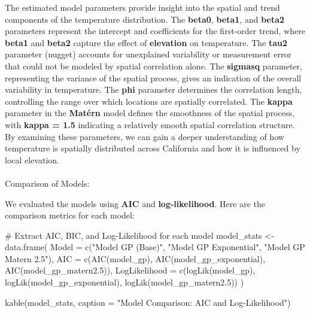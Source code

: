 \documentclass[
  11pt,
]{article}
\makeatletter
\let\oldparagraph\paragraph
\renewcommand{\paragraph}{
    \@ifstar
      \xxxParagraphStar
      \xxxParagraphNoStar
  }
\newcommand{\xxxParagraphStar}[1]{\oldparagraph*{#1}\mbox{}}
\newcommand{\xxxParagraphNoStar}[1]{\oldparagraph{#1}\mbox{}}
\newenvironment{Shaded}{\begin{snugshade}}{\end{snugshade}}
\newcommand{\AttributeTok}[1]{\textcolor[rgb]{0.40,0.45,0.13}{#1}}
\newcommand{\CommentTok}[1]{\textcolor[rgb]{0.37,0.37,0.37}{#1}}
\newcommand{\FloatTok}[1]{\textcolor[rgb]{0.68,0.00,0.00}{#1}}
\newcommand{\FunctionTok}[1]{\textcolor[rgb]{0.28,0.35,0.67}{#1}}
\newcommand{\NormalTok}[1]{\textcolor[rgb]{0.00,0.23,0.31}{#1}}
\newcommand{\OtherTok}[1]{\textcolor[rgb]{0.00,0.23,0.31}{#1}}
\newcommand{\StringTok}[1]{\textcolor[rgb]{0.13,0.47,0.30}{#1}}
\makeatother
\begin{document}
The estimated model parameters provide insight into the spatial and
trend components of the temperature distribution. The \textbf{beta0},
\textbf{beta1}, and \textbf{beta2} parameters represent the intercept
and coefficients for the first-order trend, where \textbf{beta1} and
\textbf{beta2} capture the effect of \textbf{elevation} on temperature.
The \textbf{tau2} parameter (nugget) accounts for unexplained
variability or measurement error that could not be modeled by spatial
correlation alone. The \textbf{sigmasq} parameter, representing the
variance of the spatial process, gives an indication of the overall
variability in temperature. The \textbf{phi} parameter determines the
correlation length, controlling the range over which locations are
spatially correlated. The \textbf{kappa} parameter in the
\textbf{Matérn} model defines the smoothness of the spatial process,
with \textbf{kappa = 1.5} indicating a relatively smooth spatial
correlation structure. By examining these parameters, we can gain a
deeper understanding of how temperature is spatially distributed across
California and how it is influenced by local elevation.

\paragraph{Comparison of Models:}\label{comparison-of-models}

We evaluated the models using \textbf{AIC} and \textbf{log-likelihood}.
Here are the comparison metrics for each model:

\begin{Shaded}
\begin{Highlighting}[]
\CommentTok{\# Extract AIC, BIC, and Log{-}Likelihood for each model}
\NormalTok{model\_stats }\OtherTok{\textless{}{-}} \FunctionTok{data.frame}\NormalTok{(}
  \AttributeTok{Model =} \FunctionTok{c}\NormalTok{(}\StringTok{"Model GP (Base)"}\NormalTok{, }\StringTok{"Model GP Exponential"}\NormalTok{, }\StringTok{"Model GP Matern 2.5"}\NormalTok{),}
  \AttributeTok{AIC =} \FunctionTok{c}\NormalTok{(}\FunctionTok{AIC}\NormalTok{(model\_gp), }\FunctionTok{AIC}\NormalTok{(model\_gp\_exponential), }\FunctionTok{AIC}\NormalTok{(model\_gp\_matern2}\FloatTok{.5}\NormalTok{)),}
  \AttributeTok{LogLikelihood =} \FunctionTok{c}\NormalTok{(}\FunctionTok{logLik}\NormalTok{(model\_gp), }\FunctionTok{logLik}\NormalTok{(model\_gp\_exponential), }
                    \FunctionTok{logLik}\NormalTok{(model\_gp\_matern2}\FloatTok{.5}\NormalTok{))}
\NormalTok{)}

\FunctionTok{kable}\NormalTok{(model\_stats, }\AttributeTok{caption =} \StringTok{"Model Comparison: AIC and Log{-}Likelihood"}\NormalTok{)}
\end{Highlighting}
\end{Shaded}
\end{document}
